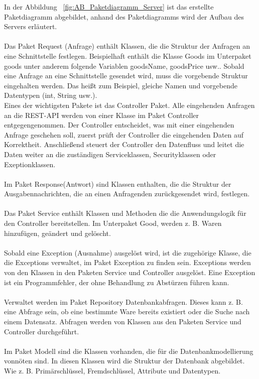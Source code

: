 In der Abbildung ~\ref{fig:AB_Paketdiagramm_Server} ist das erstellte Paketdiagramm abgebildet, anhand des Paketdiagramms wird der Aufbau des Servers erläutert. 
\\
\\
Das Paket Request (Anfrage) enthält Klassen, die die Struktur der Anfragen an eine Schnittstelle festlegen. Beispielhaft enthält die Klasse Goods im Unterpaket goods unter anderem folgende Variablen goodsName, goodsPrice usw.. Sobald eine Anfrage an eine Schnittstelle gesendet wird, muss die vorgebende Struktur eingehalten werden. Das heißt zum Beispiel, gleiche Namen und vorgebende Datentypen (int, String usw.).
\\
Eines der wichtigsten Pakete ist das Controller Paket. Alle eingehenden Anfragen an die REST-API werden von einer Klasse im Paket Controller entgegengenommen. Der Controller entscheidet, was mit einer eingehenden Anfrage geschehen soll, zuerst prüft der Controller die eingehenden Daten auf Korrektheit. Anschließend steuert der Controller den Datenfluss und leitet die Daten weiter an die zuständigen Serviceklassen, Securityklassen oder Exeptionklassen.
\\
\\
Im Paket Response(Antwort) sind Klassen enthalten, die die Struktur der Ausgabennachrichten, die an einen Anfragenden zurückgesendet wird, festlegen.
\\
\\
Das Paket Service enthält Klassen und Methoden die die Anwendungslogik für den Controller bereitstellen. Im Unterpaket Good, werden z. B. Waren hinzufügen, geändert und gelöscht.
\\
\\
Sobald eine Exception (Ausnahme) ausgelöst wird, ist die zugehörige Klasse, die die Exceptions verwaltet, im Paket Exception zu finden sein. Exceptions werden von den Klassen in den Paketen Service und Controller ausgelöst. Eine Exception ist ein Programmfehler, der ohne Behandlung zu Abstürzen führen kann.
\\
\\
Verwaltet werden im Paket Repository Datenbankabfragen. Dieses kann z. B. eine Abfrage sein, ob eine bestimmte Ware bereits existiert oder die Suche nach einem Datensatz. Abfragen werden von Klassen aus den Paketen Service und Controller durchgeführt.
\\
\\
Im Paket Modell sind die Klassen vorhanden, die für die Datenbankmodellierung vonnöten sind. In diesen Klassen wird die Struktur der Datenbank abgebildet. Wie z. B. Primärschlüssel, Fremdschlüssel, Attribute und Datentypen.

